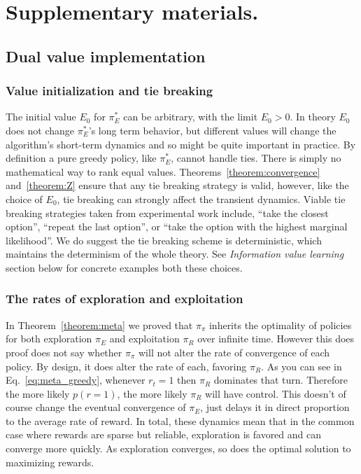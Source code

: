 \section*{Supplementary materials.}

\subsection*{Dual value implementation}
\subsubsection*{Value initialization and tie breaking} \label{sec:init_ties}
The initial value $E_0$ for $\pi^*_E$ can be arbitrary, with the limit $E_0 > 0$. In theory $E_0$ does not change $\pi^*_E$'s long term behavior, but different values will change the algorithm's short-term dynamics and so might be quite important in practice. By definition a pure greedy policy, like $\pi^*_E$, cannot handle ties. There is simply no mathematical way to rank equal values. Theorems~\ref{theorem:convergence} and~\ref{theorem:Z} ensure that any tie breaking strategy is valid, however, like the choice of $E_0$, tie breaking can strongly affect the transient dynamics. Viable tie breaking strategies taken from experimental work include, ``take the closest option'', ``repeat the last option'', or ``take the option with the highest marginal likelihood''. We do suggest the tie breaking scheme is deterministic, which maintains the determinism of the whole theory. See \emph{Information value learning} section below for concrete examples both these choices.

\subsubsection*{The rates of exploration and exploitation}
In Theorem~\ref{theorem:meta} we proved that $\pi_{\pi}$ inherits the optimality of policies for both exploration $\pi_E$ and exploitation $\pi_R$ over infinite time. However this does proof does not say whether $\pi_{\pi}$ will not alter the rate of convergence of each policy. By design, it does alter the rate of each, favoring $\pi_R$. As you can see in Eq.~\ref{eq:meta_greedy}, whenever $r_t = 1$ then $\pi_R$ dominates that turn. Therefore the more likely $p(r=1)$, the more likely $\pi_R$ will have control. This doesn't of course change the eventual convergence of $\pi_E$, just delays it in direct proportion to the average rate of reward. In total, these dynamics mean that in the common case where rewards are sparse but reliable, exploration is favored and can converge more quickly. As exploration converges, so does the optimal solution to maximizing rewards.

